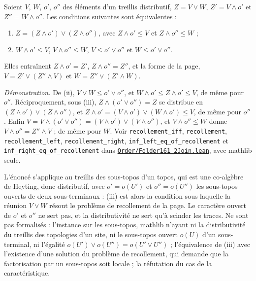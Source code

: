 \begin{encadre}
\begin{enonce}
Soient $V$, $W$, $o'$, $o''$ des éléments d'un treillis distributif, $Z = V \vee W$, $Z' = V \wedge o'$ et $Z'' = W \wedge o''$. Les conditions suivantes sont équivalentes :
\begin{enumerate}
\item[(ii)] $Z = (Z \wedge o') \vee (Z \wedge o'')$, avec $Z \wedge o' \leq V$ et $Z \wedge o'' \leq W$ ;
\item[(iii)] $W \wedge o' \leq V$, $V \wedge o'' \leq W$, $V \leq o' \vee o''$ et $W \leq o' \vee o''$.
\end{enumerate}
Elles entraînent $Z \wedge o' = Z'$, $Z \wedge o'' = Z''$, et la forme de la page, $V = Z' \vee (Z'' \wedge V)$ et $W = Z'' \vee (Z' \wedge W)$.
\end{enonce}
\end{encadre}
{\small \emph{Démonstration.} De (ii), $V \vee W \leq o' \vee o''$, et $W \wedge o' \leq Z \wedge o' \leq V$, de même pour $o''$. Réciproquement, sous (iii), $Z \wedge (o' \vee o'') = Z$ se distribue en $(Z \wedge o') \vee (Z \wedge o'')$, et $Z \wedge o' = (V \wedge o') \vee (W \wedge o') \leq V$, de même pour $o''$. Enfin $V = V \wedge (o' \vee o'') = (V \wedge o') \vee (V \wedge o'')$, et $V \wedge o'' \leq W$ donne $V \wedge o'' = Z'' \wedge V$ ; de même pour $W$. Voir \texttt{recollement\_iff}, \texttt{recollement}, \texttt{recollement\_left}, \texttt{recollement\_right}, \texttt{inf\_left\_eq\_of\_recollement} et \texttt{inf\_right\_eq\_of\_recollement} dans \href{\leanblobmain/Order/Folder161_2Join.lean}{\texttt{Order/\allowbreak{}Folder161\_2Join.\allowbreak{}lean}}, avec mathlib seule.

L'énoncé s'applique au treillis des sous-topos d'un topos, qui est une co-algèbre de Heyting, donc distributif, avec $o' = o(U')$ et $o'' = o(U'')$ les sous-topos ouverts de deux sous-terminaux : (iii) est alors la condition sous laquelle la réunion $V \vee W$ résout le problème de recollement de la page. Le caractère ouvert de $o'$ et $o''$ ne sert pas, et la distributivité ne sert qu'à scinder les traces. Ne sont pas formalisés : l'instance sur les sous-topos, mathlib n'ayant ni la distributivité du treillis des topologies d'un site, ni le sous-topos ouvert $o(U)$ d'un sous-terminal, ni l'égalité $o(U') \vee o(U'') = o(U' \vee U'')$ ; l'équivalence de (iii) avec l'existence d'une solution du problème de recollement, qui demande que la factorisation par un sous-topos soit locale ; la réfutation du cas de la caractéristique.\par}

